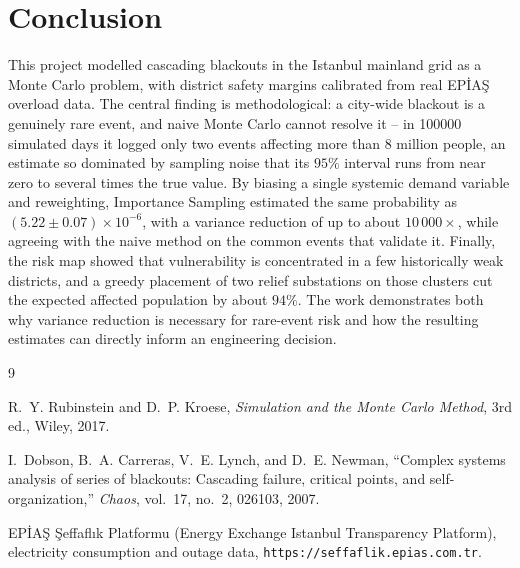 \documentclass[11pt,a4paper]{article}
\begin{document}
\section{Conclusion}

This project modelled cascading blackouts in the Istanbul mainland grid as a
Monte Carlo problem, with district safety margins calibrated from real EPİAŞ
overload data. The central finding is methodological: a city-wide blackout is a
genuinely rare event, and naive Monte Carlo cannot resolve it -- in \num{100000}
simulated days it logged only two events affecting more than 8 million people, an
estimate so dominated by sampling noise that its $95\%$ interval runs from near
zero to several times the true value. By biasing a single systemic demand
variable and reweighting, Importance Sampling estimated the same probability as
$(5.22 \pm 0.07)\times 10^{-6}$, with a variance reduction of up to about
$10\,000\times$, while agreeing with the naive method on the common events that
validate it. Finally, the risk map showed that vulnerability is concentrated in a
few historically weak districts, and a greedy placement of two relief substations
on those clusters cut the expected affected population by about $94\%$. The work
demonstrates both why variance reduction is necessary for rare-event risk and how
the resulting estimates can directly inform an engineering decision.

\begin{thebibliography}{9}

 R.~Y. Rubinstein and D.~P. Kroese,
\emph{Simulation and the Monte Carlo Method}, 3rd ed., Wiley, 2017.

 I.~Dobson, B.~A. Carreras, V.~E. Lynch, and D.~E. Newman,
``Complex systems analysis of series of blackouts: Cascading failure, critical
points, and self-organization,'' \emph{Chaos}, vol.~17, no.~2, 026103, 2007.

 EPİAŞ Şeffaflık Platformu (Energy Exchange Istanbul Transparency
Platform), electricity consumption and outage data,
\texttt{https://seffaflik.epias.com.tr}.

\end{thebibliography}
\end{document}
